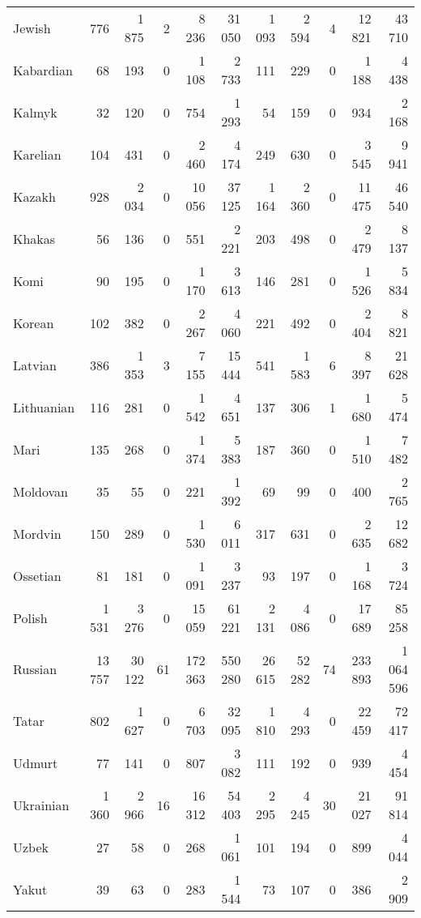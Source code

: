 \begin{table}[!h]
\begin{tabular}{lrrrrrrrrrr}
Jewish & 776 & 1 875 & 2 & 8 236 & 31 050 & 1 093 & 2 594 & 4 & 12 821 & 43 710\\
Kabardian & 68 & 193 & 0 & 1 108 & 2 733 & 111 & 229 & 0 & 1 188 & 4 438\\
Kalmyk & 32 & 120 & 0 & 754 & 1 293 & 54 & 159 & 0 & 934 & 2 168\\
Karelian & 104 & 431 & 0 & 2 460 & 4 174 & 249 & 630 & 0 & 3 545 & 9 941\\
Kazakh & 928 & 2 034 & 0 & 10 056 & 37 125 & 1 164 & 2 360 & 0 & 11 475 & 46 540\\
Khakas & 56 & 136 & 0 & 551 & 2 221 & 203 & 498 & 0 & 2 479 & 8 137\\
Komi & 90 & 195 & 0 & 1 170 & 3 613 & 146 & 281 & 0 & 1 526 & 5 834\\
Korean & 102 & 382 & 0 & 2 267 & 4 060 & 221 & 492 & 0 & 2 404 & 8 821\\
Latvian & 386 & 1 353 & 3 & 7 155 & 15 444 & 541 & 1 583 & 6 & 8 397 & 21 628\\
Lithuanian & 116 & 281 & 0 & 1 542 & 4 651 & 137 & 306 & 1 & 1 680 & 5 474\\
Mari & 135 & 268 & 0 & 1 374 & 5 383 & 187 & 360 & 0 & 1 510 & 7 482\\
Moldovan & 35 & 55 & 0 & 221 & 1 392 & 69 & 99 & 0 & 400 & 2 765\\
Mordvin & 150 & 289 & 0 & 1 530 & 6 011 & 317 & 631 & 0 & 2 635 & 12 682\\
Ossetian & 81 & 181 & 0 & 1 091 & 3 237 & 93 & 197 & 0 & 1 168 & 3 724\\
Polish & 1 531 & 3 276 & 0 & 15 059 & 61 221 & 2 131 & 4 086 & 0 & 17 689 & 85 258\\
Russian & 13 757 & 30 122 & 61 & 172 363 & 550 280 & 26 615 & 52 282 & 74 & 233 893 & 1 064 596\\
Tatar & 802 & 1 627 & 0 & 6 703 & 32 095 & 1 810 & 4 293 & 0 & 22 459 & 72 417\\
Udmurt & 77 & 141 & 0 & 807 & 3 082 & 111 & 192 & 0 & 939 & 4 454\\
Ukrainian & 1 360 & 2 966 & 16 & 16 312 & 54 403 & 2 295 & 4 245 & 30 & 21 027 & 91 814\\
Uzbek & 27 & 58 & 0 & 268 & 1 061 & 101 & 194 & 0 & 899 & 4 044\\
Yakut & 39 & 63 & 0 & 283 & 1 544 & 73 & 107 & 0 & 386 & 2 909\\
\bottomrule
\end{tabular}
\end{table}